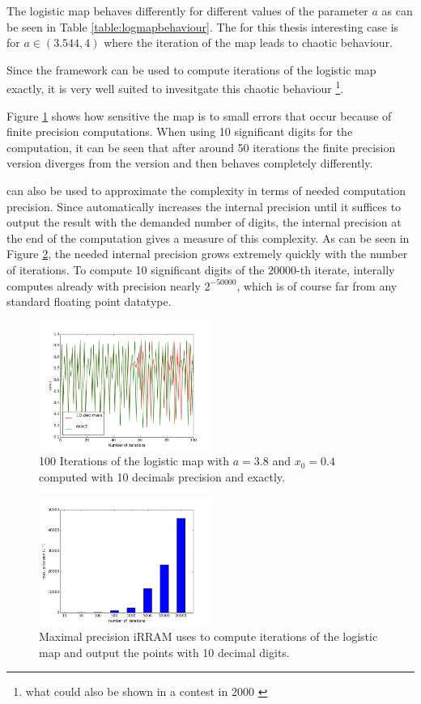   The logistic map behaves differently for different values of the parameter $a$ as can be seen in Table \ref{table:logmapbehaviour}. 
  The for this thesis interesting case is for $a \in (3.544, 4)$ where the iteration of the map leads to chaotic behaviour.

  Since the \irram framework can be used to compute iterations of the logistic map exactly, it is very well suited to invesitgate this chaotic behaviour \footnote{what could also be shown in a contest in 2000 \cite{competition:2001}}. 

  Figure \ref{fig:logmaperror1} shows how sensitive the map is to small errors that occur because of finite precision computations. 
  When using 10 significant digits for the computation, it can be seen that after around 50 iterations the finite precision version diverges from the \irram version and then behaves completely differently. 

  \irram can also be used to approximate the complexity in terms of needed computation precision. Since \irram automatically increases the internal precision until it suffices to output the result with the demanded number of digits, the internal precision at the end of the computation gives a measure of this complexity. As can be seen in Figure \ref{fig:logmapprec}, the needed internal precision grows extremely quickly with the number of iterations.
  To compute 10 significant digits of the $20000$-th iterate, \irram interally computes already with precision nearly $2^{-50000}$, which is of course far from any standard floating point datatype.   
\begin{figure}\label{fig:logmaperror1}
\centering
\includegraphics[width=0.5\textwidth]{img/dynamic_systems/logmap1}
\caption{100 Iterations of the logistic map with $a=3.8$ and $x_0 = 0.4$ computed with 10 decimals precision and exactly.}
\end{figure}
\begin{figure}\label{fig:logmapprec}
\centering
\includegraphics[width=0.5\textwidth]{img/dynamic_systems/logmap2}
\caption{Maximal precision iRRAM uses to compute iterations of the logistic map and output the points with 10 decimal digits.}
\end{figure}
